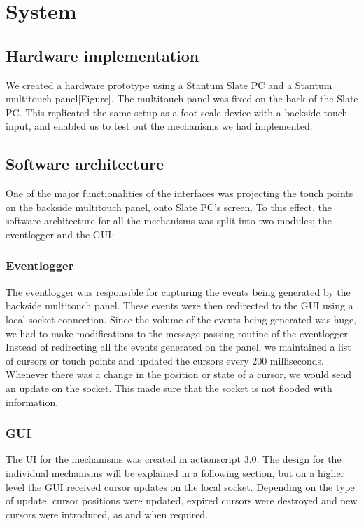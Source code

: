 \section{System}

\subsection{Hardware implementation}

We created a hardware prototype using a Stantum Slate PC and a Stantum
multitouch panel[Figure]. The multitouch panel was fixed on the back
of the Slate PC. This replicated the same setup as a foot-scale device
with a backside touch input, and enabled us to test out the mechanisms
we had implemented.

\subsection{Software architecture}

One of the major functionalities of the interfaces was projecting the
touch points on the backside multitouch panel, onto Slate PC's
screen. To this effect, the software architecture for all the
mechanisms was split into two modules; the eventlogger and the GUI:

\subsubsection{Eventlogger}

The eventlogger was responsible for capturing the events being
generated by the backside multitouch panel. These events were then
redirected to the GUI using a local socket connection. Since the
volume of the events being generated was huge, we had to make
modifications to the message passing routine of the
eventlogger. Instead of redirecting all the events generated on the
panel, we maintained a list of cursors or touch points and updated the
cursors every 200 milliseconds. Whenever there was a change in the
position or state of a cursor, we would send an update on the
socket. This made sure that the socket is not flooded with
information.

\subsubsection{GUI}

The UI for the mechanisms was created in actionscript 3.0. The design
for the individual mechanisms will be explained in a following
section, but on a higher level the GUI received cursor updates on the
local socket. Depending on the type of update, cursor positions were
updated, expired cursors were destroyed and new cursors were
introduced, as and when required.
